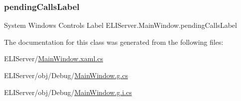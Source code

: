 \subsubsection{\texorpdfstring{pending\+Calls\+Label}{pendingCallsLabel}}
{\footnotesize\ttfamily System Windows Controls Label E\+L\+I\+Server.\+Main\+Window.\+pending\+Calls\+Label\hspace{0.3cm}{\ttfamily [package]}}



The documentation for this class was generated from the following files\+:\begin{DoxyCompactItemize}
\item 
E\+L\+I\+Server/\hyperlink{_main_window_8xaml_8cs}{Main\+Window.\+xaml.\+cs}\item 
E\+L\+I\+Server/obj/\+Debug/\hyperlink{_main_window_8g_8cs}{Main\+Window.\+g.\+cs}\item 
E\+L\+I\+Server/obj/\+Debug/\hyperlink{_main_window_8g_8i_8cs}{Main\+Window.\+g.\+i.\+cs}\end{DoxyCompactItemize}
